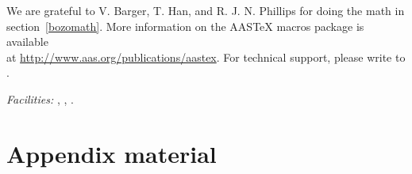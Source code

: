 \documentclass[manuscript]{../aastex52/aastex}
\begin{document}
\acknowledgments

We are grateful to V. Barger, T. Han, and R. J. N. Phillips for
doing the math in section~\ref{bozomath}.
More information on the AASTeX macros package is available \\ at
\url{http://www.aas.org/publications/aastex}.
For technical support, please write to
.



{\it Facilities:} , , .



\appendix

\section{Appendix material}
\end{document}
